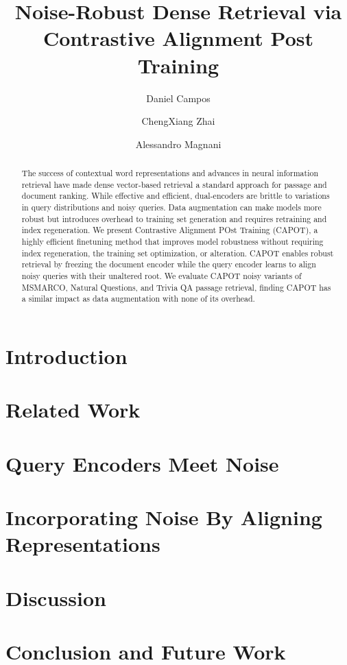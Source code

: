 \documentclass[11pt]{article}
\title{Noise-Robust Dense Retrieval via Contrastive Alignment Post Training}
\author[1,]{Daniel Campos}
\author[1]{ChengXiang Zhai}
\author[2]{Alessandro Magnani}
\affil[1]{Department of Computer Science, the University of Illinois Urbana-Champaign}
\affil[2]{Walmart Labs}
\begin{document}
\maketitle

\begin{abstract}
The success of contextual word representations and advances in neural information retrieval have made dense vector-based retrieval a standard approach for passage and document ranking. While effective and efficient, dual-encoders are brittle to variations in query distributions and noisy queries. Data augmentation can make models more robust but introduces overhead to training set generation and requires retraining and index regeneration. We present Contrastive Alignment POst Training (CAPOT), a highly efficient finetuning method that improves model robustness without requiring index regeneration, the training set optimization, or alteration. CAPOT enables robust retrieval by freezing the document encoder while the query encoder learns to align noisy queries with their unaltered root. We evaluate CAPOT noisy variants of MSMARCO, Natural Questions, and Trivia QA passage retrieval, finding CAPOT has a similar impact as data augmentation with none of its overhead.
\end{abstract}
\section{Introduction}
\label{sec:intro}

\section{Related Work}
\label{sec:rel}

\section{Query Encoders Meet Noise}
\label{sec:create}

\section{Incorporating Noise By Aligning Representations}

\section{Discussion}

\section{Conclusion and Future Work}



\appendix

\end{document}
